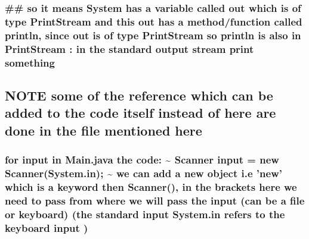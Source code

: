\documentclass[11pt]{article}
\begin{document}
\subsubsection{\#\# so it means System has a variable called out which is of type PrintStream and this out has a method/function called println, since out is of type PrintStream so println is also in PrintStream : in the standard output stream print something}
\label{sec:orga228715}

\subsection{\textbf{NOTE} some of the reference  which can be added to the code itself instead of here are done in the file mentioned here}
\label{sec:org383ff5a}

\subsubsection{for input in Main.java the code: \textasciitilde{} Scanner input = new Scanner(System.in); \textasciitilde{}  we can add a new object i.e 'new' which is a keyword then Scanner(), in the brackets here we need to pass from where we will pass the input (can be a file or keyboard) (the standard input System.in refers to the keyboard input )}
\label{sec:orgfda595d}
\end{document}
